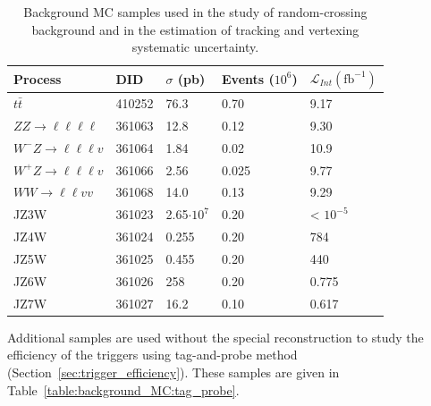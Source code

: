 \begin{table}[!htb]
  \centering
  \begin{tabular}{ l l l l l}
    \hline
    \hline
    Process         &   DID     &   $\sigma$ (pb)       & Events ($10^{6}$) &   $\mathcal{L}_{Int} (\mathrm{fb^{-1}})$ \\
    \hline
    $t\bar{t}$                              &   410252  &   76.3   &   0.70        &   9.17                 \\
    $ZZ\rightarrow \ell \ell \ell \ell$     &   361063  &   12.8   &   0.12        &   9.30                 \\
    $W^{-}Z\rightarrow \ell \ell \ell v$    &   361064  &   1.84   &   0.02        &   10.9                 \\
    $W^{+}Z\rightarrow \ell \ell \ell v$    &   361066  &   2.56   &   0.025       &   9.77                 \\
    $WW \rightarrow \ell \ell vv$           &   361068  &   14.0   &   0.13        &   9.29                 \\
    JZ3W                                    &   361023  &   2.65$\cdot10^{7}$      &   0.20  &   < $10^{-5}$\\
    JZ4W                                    &   361024  &   0.255  &   0.20        &   784                  \\
    JZ5W                                    &   361025  &   0.455  &   0.20        &   440                  \\
    JZ6W                                    &   361026  &   258                    &   0.20  &   0.775      \\
    JZ7W                                    &   361027  &   16.2                   &   0.10  &   0.617      \\
    \hline
    \hline
  \end{tabular}
  \caption{Background MC samples used in the study of random-crossing background and in the estimation of tracking and vertexing systematic uncertainty.}
  \label{table:background_MC}
\end{table}


Additional samples are used without the special reconstruction to study the efficiency of the triggers using tag-and-probe method (Section~\ref{sec:trigger_efficiency}). These samples are given in Table~\ref{table:background_MC:tag_probe}.

